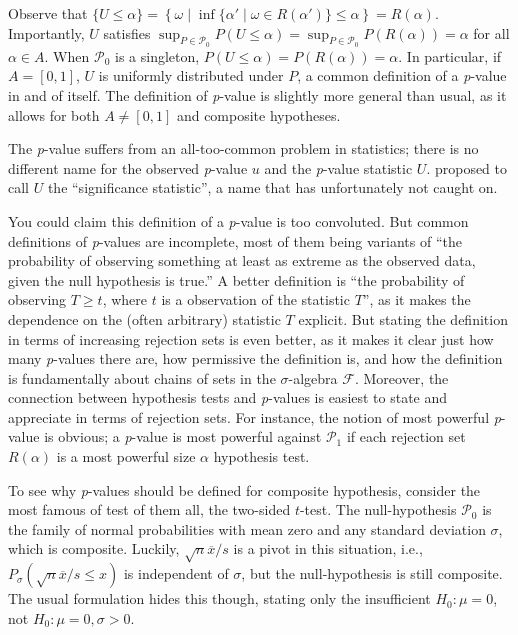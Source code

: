 Observe that $\{U\leq\alpha\}=\left\{ \omega\mid\inf\{\alpha'\mid\omega\in R(\alpha')\}\leq\alpha\right\}=R(\alpha)$.
Importantly, $U$ satisfies $\sup_{P\in\mathcal{P}_{0}}P(U\leq\alpha)=\sup_{P\in\mathcal{P}_{0}}P(R(\alpha))=\alpha$
for all $\alpha\in A$. When $\mathcal{P}_{0}$ is a singleton, $P(U\leq\alpha)=P(R(\alpha))=\alpha$.
In particular, if $A=[0,1]$, $U$ is uniformly distributed under $P$, a common definition of a \textit{p}-value in and of itself. The definition of \textit{p}-value is slightly more general than usual, as it allows for both $A\neq[0,1]$ and composite hypotheses. 

The \textit{p}-value suffers from an all-too-common problem in statistics; there is no different name for the observed \textit{p}-value $u$ and the \textit{p}-value statistic $U$. \textcite{Schweder1988-nh} proposed to call $U$ the ``significance statistic'', a name that has unfortunately not caught on. 

You could claim this definition of a \textit{p}-value is too convoluted. But common definitions of\emph{ p}-values are incomplete, most of them being variants of ``the probability of observing something at least as extreme as the observed data, given the null hypothesis is true.'' A better definition is ``the probability of observing $T\geq t$, where $t$ is a observation of the statistic $T$'', as it makes the dependence on the (often arbitrary) statistic $T$ explicit. But stating the definition in terms of increasing rejection sets is even better, as it makes it clear just how many \textit{p}-values there are, how permissive the definition is, and how the definition is fundamentally about chains of sets in the $\sigma$-algebra $\mathcal{F}$. Moreover, the connection between hypothesis tests and \textit{p}-values is easiest to state and appreciate in terms of rejection sets. For instance, the notion of most powerful \textit{p}-value is obvious; a \textit{p}-value is most powerful against $\mathcal{P}_{1}$ if each rejection set $R(\alpha)$ is a most powerful size $\alpha$ hypothesis test. 

To see why \textit{p}-values should be defined for composite hypothesis, consider the most famous of test of them all, the two-sided $t$-test. The null-hypothesis $\mathcal{P}_{0}$ is the family of normal probabilities with mean zero and any standard deviation $\sigma$, which is composite. Luckily, $\sqrt{n}\overline{x}/s$ is a pivot in this situation, i.e., $P_{\sigma}(\sqrt{n}\overline{x}/s\leq x)$ is independent of $\sigma$, but the null-hypothesis is still composite. The usual formulation hides this though, stating only the insufficient $H_0:\mu = 0$, not $H_0:\mu=0,\sigma>0$.

